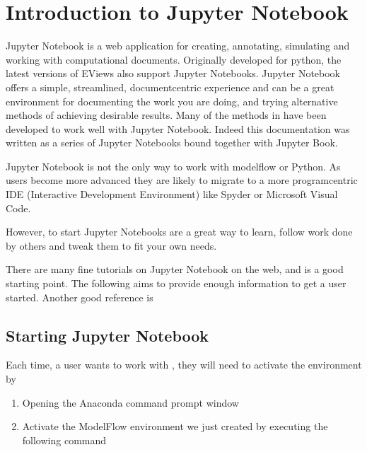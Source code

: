 \documentclass[letterpaper,10pt,english]{jupyterBook}
\begin{document}
\chapter{Introduction to  Jupyter Notebook}
\label{\detokenize{content/04_PythonEssentials/Intro_Jupyter_notebook:introduction-to-jupyter-notebook}}\label{\detokenize{content/04_PythonEssentials/Intro_Jupyter_notebook::doc}}
\sphinxAtStartPar
Jupyter Notebook is a web application for creating, annotating, simulating and working with computational documents.  Originally developed for python, the latest versions of EViews also support Jupyter Notebooks. Jupyter Notebook offers a simple, streamlined, document\sphinxhyphen{}centric experience and can be a great environment for documenting the work you are doing, and trying alternative methods of achieving desirable results.  Many of the methods in  have been developed to work well with Jupyter Notebook. Indeed this documentation was written as a series of Jupyter Notebooks bound together with Jupyter Book.

\sphinxAtStartPar
Jupyter Notebook is not the only way to work with modelflow or Python.  As users become more advanced they are likely to migrate to a more program\sphinxhyphen{}centric IDE (Interactive Development Environment) like Spyder or Microsoft Visual Code.

\sphinxAtStartPar
However, to start Jupyter Notebooks are a great way to learn, follow work done by others and tweak them to fit your own needs.

\sphinxAtStartPar
There are many fine tutorials on Jupyter Notebook on the web, and  is a good starting point. The following aims to provide enough information to get a user started.  Another good reference is 


\section{Starting Jupyter Notebook}
\label{\detokenize{content/04_PythonEssentials/Intro_Jupyter_notebook:starting-jupyter-notebook}}
\sphinxAtStartPar
Each time, a user wants to work with , they will need to activate the  environment by
\begin{enumerate}
%
\item {} 
\sphinxAtStartPar
Opening the Anaconda command prompt window

\item {} 
\sphinxAtStartPar
Activate the ModelFlow environment we just created by executing the following command

\end{enumerate}
\end{document}
